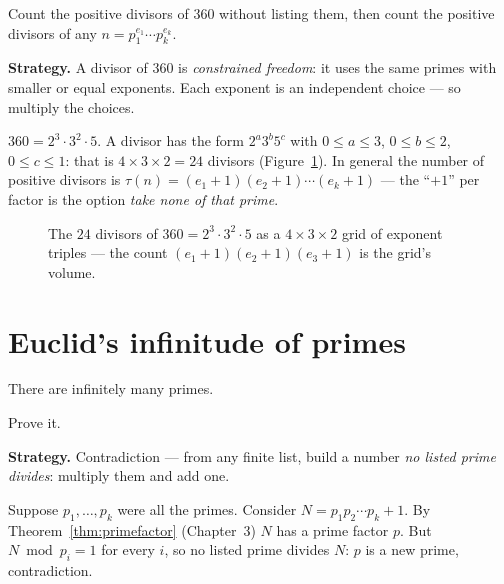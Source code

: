 \begin{example}\label{ex:taucount}
Count the positive divisors of $360$ without listing them, then count the
positive divisors of any $n = p_1^{e_1}\cdots p_k^{e_k}$.
\par\smallskip
\textbf{Strategy.} A divisor of $360$ is \emph{constrained freedom}: it
uses the same primes with smaller or equal exponents. Each exponent is an
independent choice --- so multiply the choices.
\par\smallskip
\begin{solution}
$360 = 2^3\cdot 3^2\cdot 5$. A divisor has the form $2^a 3^b 5^c$ with
$0 \le a \le 3$, $0 \le b \le 2$, $0 \le c \le 1$: that is
$4\times3\times2 = 24$ divisors (Figure~\ref{fig:divgrid}). In general the
number of positive divisors is
$\tau(n) = (e_1 + 1)(e_2 + 1)\cdots(e_k + 1)$ --- the ``$+1$'' per factor
is the option \emph{take none of that prime}.
\end{solution}
\end{example}

\begin{figure}[ht]\centering

\caption{The $24$ divisors of $360 = 2^3\cdot 3^2\cdot 5$ as a
$4\times3\times2$ grid of exponent triples --- the count
$(e_1+1)(e_2+1)(e_3+1)$ is the grid's volume.}
\label{fig:divgrid}
\end{figure}

\section{Euclid's infinitude of primes}\label{sec:infprimes}

\begin{theorem}
There are infinitely many primes.
\end{theorem}

\begin{example}
Prove it.
\par\smallskip
\textbf{Strategy.} Contradiction --- from any finite list, build a number
\emph{no listed prime divides}: multiply them and add one.
\par\smallskip
\begin{solution}
Suppose $p_1, \dots, p_k$ were all the primes. Consider
$N = p_1 p_2 \cdots p_k + 1$. By Theorem~\ref{thm:primefactor} (Chapter~3)
$N$ has a prime factor $p$. But $N \bmod p_i = 1$ for every $i$, so no
listed prime divides $N$: $p$ is a new prime, contradiction.
\end{solution}
\end{example}

